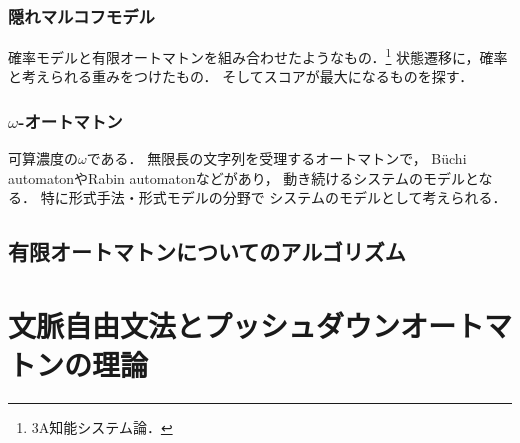 \subsection{隠れマルコフモデル}

確率モデルと有限オートマトンを組み合わせたようなもの．\footnote{3A知能システム論．}
状態遷移に，確率と考えられる重みをつけたもの．
そしてスコアが最大になるものを探す．

\subsection{$\omega$-オートマトン}

可算濃度の$\omega$である．
無限長の文字列を受理するオートマトンで，
Büchi automatonやRabin automatonなどがあり，
動き続けるシステムのモデルとなる．
特に形式手法・形式モデルの分野で
システムのモデルとして考えられる．

\section{有限オートマトンについてのアルゴリズム}

\begin{tcolorbox}[colframe=ForestGreen, colback=ForestGreen!10!white, breakable]
    
\end{tcolorbox}

\chapter{文脈自由文法とプッシュダウンオートマトンの理論}

